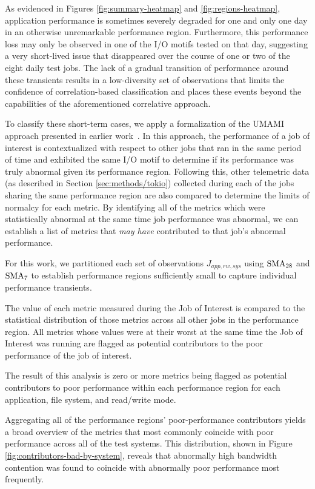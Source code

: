 As evidenced in Figures \ref{fig:summary-heatmap} and \ref{fig:regions-heatmap}, application performance is sometimes severely degraded for one and only one day in an otherwise unremarkable performance region.
Furthermore, this performance loss may only be observed in one of the I/O motifs tested on that day, suggesting a very short-lived issue that disappeared over the course of one or two of the eight daily test jobs.
The lack of a gradual transition of performance around these transients results in a low-diversity set of observations that limits the confidence of correlation-based classification and places these events beyond the capabilities of the aforementioned correlative approach.

To classify these short-term cases, we apply a formalization of the UMAMI approach presented in earlier work~\cite{Lockwood2017}.
In this approach, the performance of a job of interest is contextualized with respect to other jobs that ran in the same period of time and exhibited the same I/O motif to determine if its performance was truly abnormal given its performance region.
Following this, other telemetric data (as described in Section \ref{sec:methods/tokio}) collected during each of the jobs sharing the same performance region are also compared to determine the limits of normalcy for each metric.
By identifying all of the metrics which were statistically abnormal at the same time job performance was abnormal, we can establish a list of metrics that \emph{may have} contributed to that job's abnormal performance.

For this work, we partitioned each set of observations $J_{app, rw, sys}$ using $\textup{SMA}_{28}$ and $\textup{SMA}_{7}$ to establish performance regions sufficiently small to capture individual performance transients.


The value of each metric measured during the Job of Interest is compared to the statistical distribution of those metrics across all other jobs in the performance region.  All metrics whose values were at their worst at the same time the Job of Interest was running are flagged as potential contributors to the poor performance of the job of interest.

The result of this analysis is zero or more metrics being flagged as potential contributors to poor performance within each performance region for each application, file system, and read/write mode.

Aggregating all of the performance regions' poor-performance contributors yields a broad overview of the metrics that most commonly coincide with poor performance across all of the test systems.
This distribution, shown in Figure \ref{fig:contributors-bad-by-system}, reveals that abnormally high bandwidth contention was found to coincide with abnormally poor performance most frequently.


